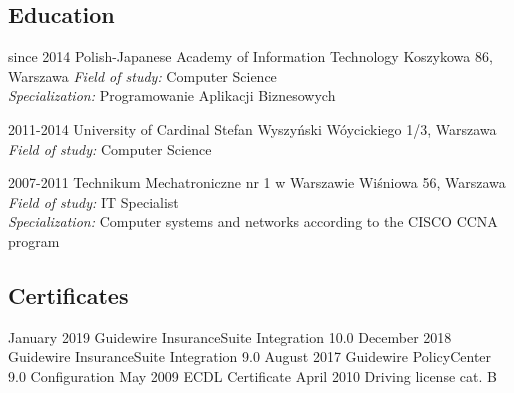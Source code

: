 \documentclass[]{friggeri-cv} %
\begin{document}
	\begin{absolutelynopagebreak}
		\section{Education}
		\begin{entrylist}
			\entry
			{since 2014}
			{Polish-Japanese Academy of Information Technology}
			{Koszykowa 86, Warszawa}
			{\emph{Field of study:} Computer Science\\
			\emph{Specialization:} Programowanie Aplikacji Biznesowych}
		\end{entrylist}
		\begin{entrylist}
			\entry
			{2011-2014}
			{University of Cardinal Stefan Wyszyński}
			{Wóycickiego 1/3, Warszawa}
			{\emph{Field of study:} Computer Science}
		\end{entrylist}
		\begin{entrylist}
			\entry
			{2007-2011}
			{Technikum Mechatroniczne nr 1 w Warszawie}
			{Wiśniowa 56, Warszawa}
			{\emph{Field of study:} IT Specialist\\
			\emph{Specialization:} Computer systems and networks according to the CISCO CCNA program}
		\end{entrylist}
	\end{absolutelynopagebreak}
	
	\begin{absolutelynopagebreak}
		\section{Certificates}
		\begin{entrylist}
			\cert
			{January 2019}
			{Guidewire InsuranceSuite Integration 10.0}
			\cert
			{December 2018}
			{Guidewire InsuranceSuite Integration 9.0}
			\cert
			{August 2017}
			{Guidewire PolicyCenter 9.0 Configuration}
			\cert
			{May 2009}
			{ECDL Certificate}
			\cert
			{April 2010}
			{Driving license cat. B}
		\end{entrylist}
	\end{absolutelynopagebreak}
	
\end{document}

